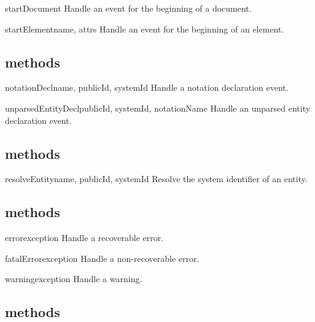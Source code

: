 \documentclass{howto}
\begin{document}
\begin{methoddesc}{startDocument}{}
Handle an event for the beginning of a document.
\end{methoddesc}

\begin{methoddesc}{startElement}{name, attrs}
Handle an event for the beginning of an element.
\end{methoddesc}


\subsection{ methods}

\begin{methoddesc}{notationDecl}{name, publicId, systemId}
Handle a notation declaration event.
\end{methoddesc}

\begin{methoddesc}{unparsedEntityDecl}{publicId, systemId, notationName}
Handle an unparsed entity declaration event.
\end{methoddesc}


\subsection{ methods}

\begin{methoddesc}{resolveEntity}{name, publicId, systemId}
Resolve the system identifier of an entity.
\end{methoddesc}

\subsection{ methods}

\begin{methoddesc}{error}{exception}
Handle a recoverable error.
\end{methoddesc}

\begin{methoddesc}{fatalError}{exception}
Handle a non-recoverable error.
\end{methoddesc}

\begin{methoddesc}{warning}{exception}
Handle a warning.
\end{methoddesc}

\subsection{ methods}
\end{document}
